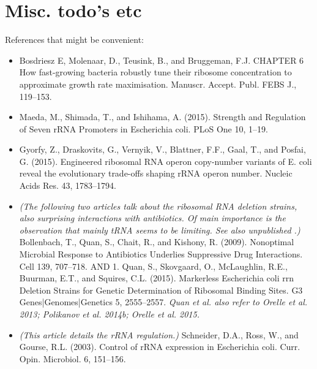 
\clearpage

{\color{red}
    \section{Misc. todo's etc}
    
    References that might be convenient:
    \begin{itemize}
        \item Bosdriesz E, Molenaar, D., Teusink, B., and Bruggeman, F.J. CHAPTER 6 How fast-growing bacteria robustly tune their ribosome concentration to approximate growth rate maximisation. Manuscr. Accept. Publ. FEBS J., 119–153.
        \cite{BosdrieszE}
        \item Maeda, M., Shimada, T., and Ishihama, A. (2015). Strength and Regulation of Seven rRNA Promoters in Escherichia coli. PLoS One 10, 1–19. \cite{Maeda2015}
        \item Gyorfy, Z., Draskovits, G., Vernyik, V., Blattner, F.F., Gaal, T., and Posfai, G. (2015). Engineered ribosomal RNA operon copy-number variants of E. coli reveal the evolutionary trade-offs shaping rRNA operon number. Nucleic Acids Res. 43, 1783–1794. \cite{Gyorfy2015}
        \item \textit{(The following two articles talk about the ribosomal RNA deletion strains, also surprising interactions with antibiotics. Of main importance is the observation that mainly tRNA seems to be limiting. See also unpublished \cite{Quan2013}.)} Bollenbach, T., Quan, S., Chait, R., and Kishony, R. (2009). Nonoptimal Microbial Response to Antibiotics Underlies Suppressive Drug Interactions. Cell 139, 707–718. \cite{Bollenbach2009} AND 1. Quan, S., Skovgaard, O., McLaughlin, R.E., Buurman, E.T., and Squires, C.L. (2015). Markerless Escherichia coli rrn Deletion Strains for Genetic Determination of Ribosomal Binding Sites. G3 Genes|Genomes|Genetics 5, 2555–2557. \cite{Quan2015} \textit{Quan et al. also refer to Orelle et al. 2013; Polikanov et al. 2014b; Orelle et al. 2015.}
        \item \textit{(This article details the rRNA regulation.)} Schneider, D.A., Ross, W., and Gourse, R.L. (2003). Control of rRNA expression in Escherichia coli. Curr. Opin. Microbiol. 6, 151–156. \cite{Schneider2003} 

\end{itemize}}
